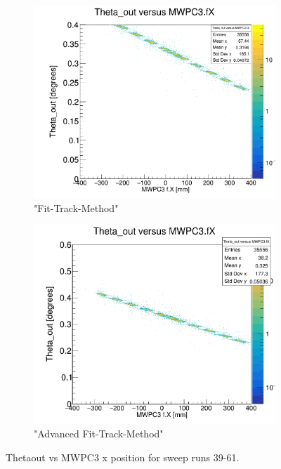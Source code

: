 \documentclass[12pt, letterpaper]{article}
\begin{document}
\begin{figure}[!htbp]
\begin{subfigure}{.5\textwidth}
  \label{fig:sub-second}
\end{subfigure}
\begin{subfigure}{.5\textwidth}
  \centering
  \includegraphics[width=.9\linewidth]{plot_imgs/theta_out_mw3_fit.png} 
  \caption{"Fit-Track-Method"}
  \label{fig:sub-second}
\end{subfigure}
\begin{subfigure}{.5\textwidth}
  \centering
  \includegraphics[width=.9\linewidth]{plot_imgs/theta_out_mw3_alpha.png} 
  \caption{"Advanced Fit-Track-Method"}
  \label{fig:sub-second}
\end{subfigure}
\caption{Theta\textunderscore out vs MWPC3 x position for sweep runs 39-61.}
\label{fig:fig}
\end{figure}
\FloatBarrier
\clearpage
\end{document}
